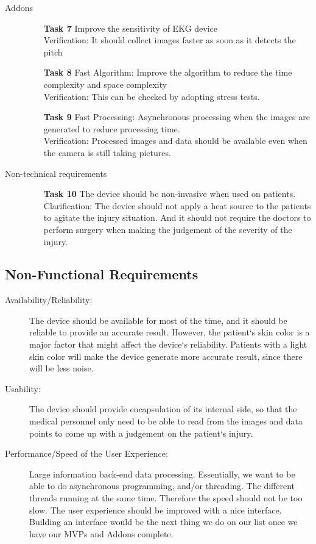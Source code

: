 \documentclass[paper=letter, fontsize=11pt]{scrartcl}
\numberwithin{equation}{section}		%
\numberwithin{figure}{section}			%
\numberwithin{table}{section}			%
\begin{document}
\begin{description}
  \item[Addons] \hspace{1cm}
  	\begin{itemize}
   	\item[\textbf{Task 7}] Improve the sensitivity of EKG device\\
	\hfill Verification: It should collect images faster as soon as it detects the pitch \\
	\item[\textbf{Task 8}] Fast Algorithm: Improve the algorithm to reduce the time complexity and space complexity \\
	\hfill Verification: This can be checked by adopting stress tests.
	\item[\textbf{Task 9}] Fast Processing: Asynchronous processing when the images are generated to reduce processing time.\\
   	\hfill Verification: Processed images and data should be available even when the camera is still taking pictures.
	\end{itemize}
	
  \item[Non-technical requirements]\hspace{1cm}
  	\begin{itemize}
	\item[\textbf{Task 10}] The device should be non-invasive when used on patients. \\
	\hfill Clarification: The device should not apply a heat source to the patients to agitate the injury situation. And it should not require the doctors to perform surgery when making the judgement of the severity of the injury.
	\end{itemize}
\end{description}

\subsection{Non-Functional Requirements}
 \begin{description}
  	\item[Availability/Reliability:]
	The device should be available for most of the time, and it should be reliable to provide an accurate result. However, the patient`s skin color is a major factor that might affect the device`s reliability. Patients with a light skin color will make the device generate more accurate result, since there will be less noise.
	\item[Usability:]
	The device should provide encapsulation of its internal side, so that the medical personnel only need to be able to read from the images and data points to come up with a judgement on the patient`s injury.
	\item[Performance/Speed of the User Experience:]
	Large information back-end data processing. Essentially, we want to be able to do asynchronous programming, and/or threading. The different threads running at the same time. Therefore the speed should not be too slow. The user experience should be improved with a nice interface. Building an interface would be the next thing we do on our list once we have our MVPs and Addons complete.
\end{description}
\end{document}
